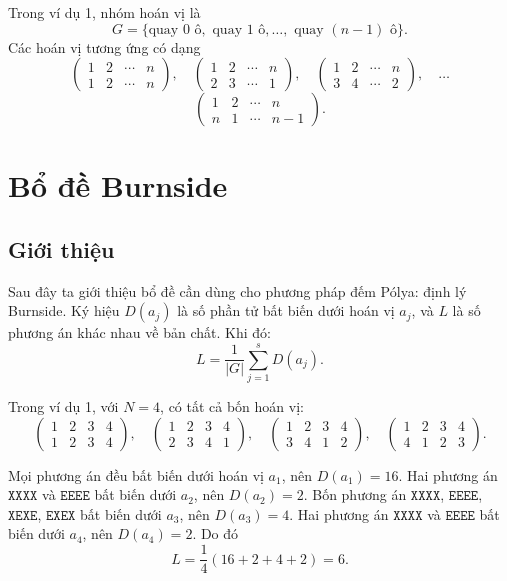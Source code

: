 \documentclass[11pt]{article}
\begin{document}
Trong ví dụ 1, nhóm hoán vị là
\[
  G=\{\text{quay }0\text{ ô},\text{ quay }1\text{ ô},\ldots,
      \text{ quay }(n-1)\text{ ô}\}.
\]
Các hoán vị tương ứng có dạng
\[
  \begin{pmatrix}
    1&2&\cdots&n\\
    1&2&\cdots&n
  \end{pmatrix},\quad
  \begin{pmatrix}
    1&2&\cdots&n\\
    2&3&\cdots&1
  \end{pmatrix},\quad
  \begin{pmatrix}
    1&2&\cdots&n\\
    3&4&\cdots&2
  \end{pmatrix},\quad\ldots
\]
\[
  \begin{pmatrix}
    1&2&\cdots&n\\
    n&1&\cdots&n-1
  \end{pmatrix}.
\]

\section{Bổ đề Burnside}

\subsection{Giới thiệu}

Sau đây ta giới thiệu bổ đề cần dùng cho phương pháp đếm Pólya: định lý
Burnside. Ký hiệu \(D(a_j)\) là số phần tử bất biến dưới hoán vị \(a_j\), và
\(L\) là số phương án khác nhau về bản chất. Khi đó:
\[
  L=\frac{1}{|G|}\sum_{j=1}^{s}D(a_j).
\]

Trong ví dụ 1, với \(N=4\), có tất cả bốn hoán vị:
\[
  \begin{pmatrix}
    1&2&3&4\\
    1&2&3&4
  \end{pmatrix},\quad
  \begin{pmatrix}
    1&2&3&4\\
    2&3&4&1
  \end{pmatrix},\quad
  \begin{pmatrix}
    1&2&3&4\\
    3&4&1&2
  \end{pmatrix},\quad
  \begin{pmatrix}
    1&2&3&4\\
    4&1&2&3
  \end{pmatrix}.
\]

Mọi phương án đều bất biến dưới hoán vị \(a_1\), nên \(D(a_1)=16\).
Hai phương án \(\texttt{XXXX}\) và \(\texttt{EEEE}\) bất biến dưới \(a_2\),
nên \(D(a_2)=2\). Bốn phương án \(\texttt{XXXX}\), \(\texttt{EEEE}\),
\(\texttt{XEXE}\), \(\texttt{EXEX}\) bất biến dưới \(a_3\), nên
\(D(a_3)=4\). Hai phương án \(\texttt{XXXX}\) và \(\texttt{EEEE}\) bất biến
dưới \(a_4\), nên \(D(a_4)=2\). Do đó
\[
  L=\frac{1}{4}(16+2+4+2)=6.
\]
\end{document}
